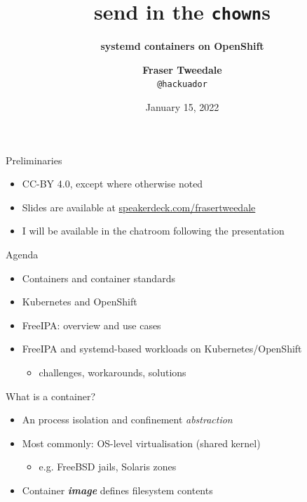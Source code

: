 \documentclass[ignorenonframetext,aspectratio=169,12pt]{beamer}
\title{\bf send in the {\tt chown}s}
\subtitle{\bf systemd containers on OpenShift}
\author{{\bf Fraser Tweedale}\\
    \texttt{@hackuador}\\
    \bigskip
    \def\svgwidth{4cm}
    }
\date{January 15, 2022}
\begin{document}
\frame{\titlepage}

\begin{frame}{Preliminaries}
\protect\hypertarget{preliminaries}{}
\begin{itemize}
    \item CC-BY 4.0, except where otherwise noted
    \item Slides are available at
      \href{https://speakerdeck.com/frasertweedale}{speakerdeck.com/frasertweedale}
    \item I will be available in the chatroom following the presentation
\end{itemize}
\end{frame}


\begin{frame}{Agenda}
\protect\hypertarget{agenda}{}

\begin{itemize}
    \item Containers and container standards
    \item Kubernetes and OpenShift
    \item FreeIPA: overview and use cases
    \item FreeIPA and systemd-based workloads on Kubernetes/OpenShift
      \begin{itemize}
      \item challenges, workarounds, solutions
      \end{itemize}
\end{itemize}

\end{frame}


\begin{frame}{What is a container?}
\protect\hypertarget{container-definition}{}

\begin{itemize}
    \item An process isolation and confinement {\em abstraction}
    \item Most commonly: OS-level virtualisation (shared kernel)
        \begin{itemize}
        \item e.g. FreeBSD jails, Solaris zones
        \end{itemize}
    \item Container \emph{\textbf{image}} defines filesystem contents
\end{itemize}

\end{frame}
\end{document}
